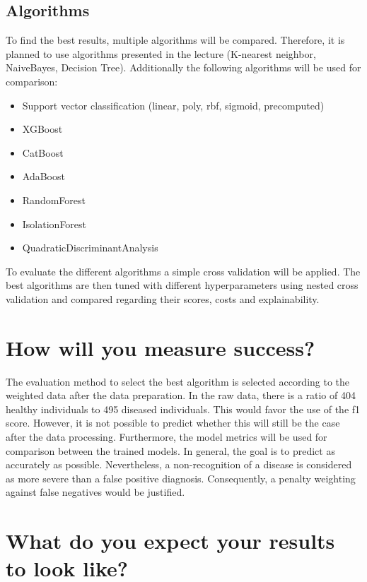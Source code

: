 \documentclass[11pt,titlepage,oneside,openany]{book}
\begin{document}
\subsection{Algorithms}

To find the best results, multiple algorithms will be compared. Therefore, it is planned to use algorithms presented in the lecture (K-nearest neighbor, NaiveBayes, Decision Tree). Additionally the following algorithms will be used for comparison:

\begin{itemize}
	\item Support vector classification (linear, poly, rbf, sigmoid, precomputed)
	\item XGBoost
	\item CatBoost
	\item AdaBoost
	\item RandomForest
	\item IsolationForest
	\item QuadraticDiscriminantAnalysis
\end{itemize}

To evaluate the different algorithms a simple cross validation will be applied. The best algorithms are then tuned with different hyperparameters using nested cross validation and compared regarding their scores, costs and explainability. 

\section{How will you measure success?}
\label{sec:success}

The evaluation method to select the best algorithm is selected according to the weighted data after the data preparation. In the raw data, there is a ratio of 404 healthy individuals to 495 diseased individuals. This would favor the use of the f1 score. However, it is not possible to predict whether this will still be the case after the data processing. 
Furthermore,  the model metrics will be used for comparison between the trained models.
In general, the goal is to predict as accurately as possible. Nevertheless, a non-recognition of a disease is considered as more severe than a false positive diagnosis. Consequently, a penalty weighting against false negatives would be justified.

\section{What do you expect your results to look like?}
\label{sec:results}
\end{document}
